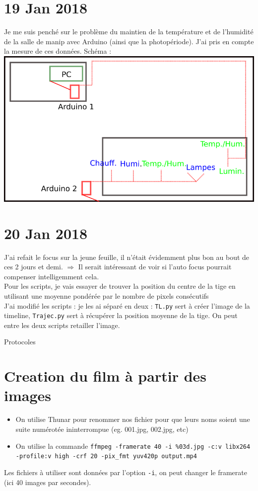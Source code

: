\documentclass[10pt,a4paper]{article}
\begin{document}
\section{19 Jan 2018}
Je me suis penché sur le problème du maintien de la température et de l'humidité de la salle de manip avec Arduino (ainsi que la photopériode). J'ai pris en compte la mesure de ces données. Schéma :\\
\includegraphics[width=0.6\linewidth]{schema_Arduino.png}

\section{20 Jan 2018}
J'ai refait le focus sur la jeune feuille, il n'était évidemment plus bon au bout de ces 2 jours et demi. $\Rightarrow$ Il serait intéressant de voir si l'auto focus pourrait compenser intelligemment cela.\\

Pour les scripts, je vais essayer de trouver la position du centre de la tige en utilisant une moyenne pondérée par le nombre de pixels consécutifs\\

J'ai modifié les scripts : je les ai séparé en deux : \texttt{TL.py} sert à créer l'image de la timeline, \texttt{Trajec.py} sert à récupérer la position moyenne de la tige. On peut entre les deux scripts retailler l'image.





\newpage
\begin{center}
        {\Huge Protocoles}
\end{center}
\appendix

\section{Creation du film à partir des images\label{film}}
\begin{itemize}
        \item On utilise Thunar pour renommer nos fichier pour que leurs noms soient une suite numérotée ininterrompue (eg. 001.jpg, 002.jpg, etc)
        \item On utilise la commande \texttt{ffmpeg -framerate 40 -i \%03d.jpg -c:v libx264 -profile:v high -crf 20 -pix\_fmt yuv420p output.mp4}
\end{itemize}
Les fichiers à utiliser sont données par l'option \texttt{-i}, on peut changer le framerate (ici 40 images par secondes).
\end{document}
